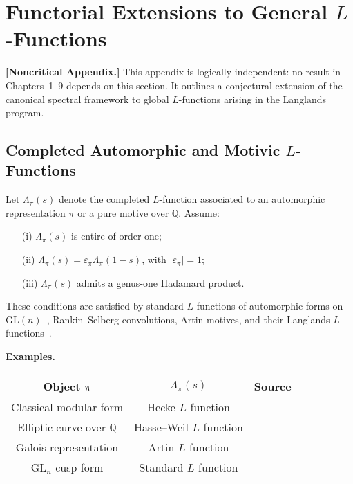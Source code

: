 \section{Functorial Extensions to General \texorpdfstring{$L$}{L}-Functions}
\label{app:functorial-extensions}

\noindent\textbf{[Noncritical Appendix.]}  
This appendix is logically independent: no result in Chapters~1–9 depends on this section. It outlines a conjectural extension of the canonical spectral framework to global \( L \)-functions arising in the Langlands program.

\subsection*{Completed Automorphic and Motivic \texorpdfstring{$L$}{L}-Functions}

Let \( \Lambda_\pi(s) \) denote the completed \( L \)-function associated to an automorphic representation \( \pi \) or a pure motive over \( \mathbb{Q} \). Assume:
\begin{itemize}
  \item[(i)] \( \Lambda_\pi(s) \) is entire of order one;
  \item[(ii)] \( \Lambda_\pi(s) = \varepsilon_\pi \Lambda_\pi(1 - s) \), with \( |\varepsilon_\pi| = 1 \);
  \item[(iii)] \( \Lambda_\pi(s) \) admits a genus-one Hadamard product.
\end{itemize}

These conditions are satisfied by standard \( L \)-functions of automorphic forms on \( \mathrm{GL}(n) \)~\cite{Cogdell2007Lectures}, Rankin–Selberg convolutions, Artin motives, and their Langlands \( L \)-functions~\cite{Langlands1970EulerProducts,Deligne1971WeilI}.

\medskip
\noindent\textbf{Examples.}
\begin{center}
\renewcommand{\arraystretch}{1.3}
\begin{tabular}{|c|c|c|}
\hline
\textbf{Object \( \pi \)} & \textbf{\( \Lambda_\pi(s) \)} & \textbf{Source} \\
\hline
Classical modular form & Hecke \( L \)-function & \cite{Cogdell2007Lectures} \\
Elliptic curve over \( \mathbb{Q} \) & Hasse–Weil \( L \)-function & \cite{Deligne1971WeilI} \\
Galois representation & Artin \( L \)-function & \cite{Langlands1970EulerProducts} \\
\(\mathrm{GL}_n\) cusp form & Standard \( L \)-function & \cite{Cogdell2007Lectures} \\
\hline
\end{tabular}
\end{center}

